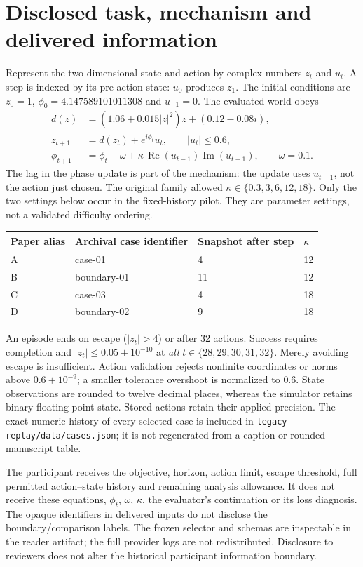 \section{Disclosed task, mechanism and delivered information}
\label{app:task}
Represent the two-dimensional state and action by complex numbers $z_t$ and $u_t$. A step is indexed by its pre-action state: $u_0$ produces $z_1$. The initial conditions are $z_0=1$, $\phi_0=4.147589101011308$ and $u_{-1}=0$. The evaluated world obeys
\begin{align}
 d(z)&=(1.06+0.015|z|^2)z+(0.12-0.08i),\\
 z_{t+1}&=d(z_t)+e^{i\phi_t}u_t,\qquad |u_t|\leq 0.6,\\
 \phi_{t+1}&=\phi_t+\omega+\kappa\,\operatorname{Re}(u_{t-1})\operatorname{Im}(u_{t-1}),\qquad\omega=0.1.
\end{align}
The lag in the phase update is part of the mechanism: the update uses $u_{t-1}$, not the action just chosen. The original family allowed $\kappa\in\{0.3,3,6,12,18\}$. Only the two settings below occur in the fixed-history pilot. They are parameter settings, not a validated difficulty ordering.

\begin{center}
\begin{tabular}{llll}
\toprule
Paper alias & Archival case identifier & Snapshot after step & $\kappa$\\
\midrule
A & case-01 & 4 & 12\\
B & boundary-01 & 11 & 12\\
C & case-03 & 4 & 18\\
D & boundary-02 & 9 & 18\\
\bottomrule
\end{tabular}
\end{center}

An episode ends on escape ($|z_t|>4$) or after 32 actions. Success requires completion and $|z_t|\leq0.05+10^{-10}$ at \emph{all} $t\in\{28,29,30,31,32\}$. Merely avoiding escape is insufficient. Action validation rejects nonfinite coordinates or norms above $0.6+10^{-9}$; a smaller tolerance overshoot is normalized to $0.6$. State observations are rounded to twelve decimal places, whereas the simulator retains binary floating-point state. Stored actions retain their applied precision. The exact numeric history of every selected case is included in \texttt{legacy-replay/data/cases.json}; it is not regenerated from a caption or rounded manuscript table.

The participant receives the objective, horizon, action limit, escape threshold, full permitted action--state history and remaining analysis allowance. It does not receive these equations, $\phi_t$, $\omega$, $\kappa$, the evaluator's continuation or its loss diagnosis. The opaque identifiers in delivered inputs do not disclose the boundary/comparison labels. The frozen selector and schemas are inspectable in the reader artifact; the full provider logs are not redistributed. Disclosure to reviewers does not alter the historical participant information boundary.

